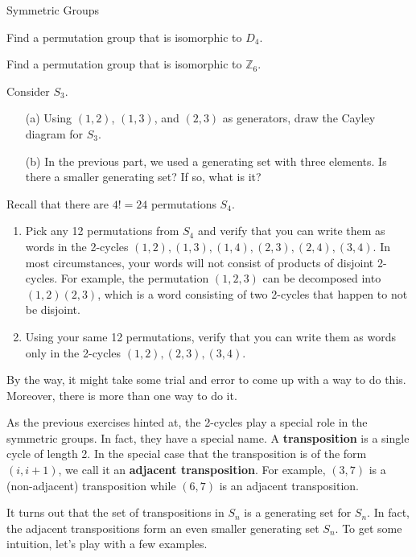 \begin{section}{Symmetric Groups}
\begin{exercise}
Find a permutation group that is isomorphic to $D_4$.
\end{exercise}

\begin{exercise}
Find a permutation group that is isomorphic to $\mathbb{Z}_6$.
\end{exercise}

\begin{exercise}
Consider $S_3$.
\begin{enumerate}
\item[(a)] Using $(1,2)$, $(1,3)$, and $(2,3)$ as generators, draw the Cayley diagram for $S_3$.
\item[(b)] In the previous part, we used a generating set with three elements.  Is there a smaller generating set?  If so, what is it?
\end{enumerate}
\end{exercise}

\begin{exercise}
Recall that there are $4!=24$ permutations $S_4$.    
\begin{enumerate}[label=\rm{(\alph*)}]
\item Pick any 12 permutations from $S_4$ and verify that you can write them as words in the 2-cycles $(1,2), (1,3), (1,4), (2,3), (2,4),(3,4)$.  In most circumstances, your words will not consist of products of disjoint 2-cycles.  For example, the permutation $(1,2,3)$ can be decomposed into $(1,2)(2,3)$, which is a word consisting of two 2-cycles that happen to not be disjoint.
\item Using your same 12 permutations, verify that you can write them as words only in the 2-cycles $(1,2),(2,3),(3,4)$.
\end{enumerate}
By the way, it might take some trial and error to come up with a way to do this.  Moreover, there is more than one way to do it.
\end{exercise}

As the previous exercises hinted at, the 2-cycles play a special role in the symmetric groups.  In fact, they have a special name.  A \textbf{transposition} is a single cycle of length 2.  In the special case that the transposition is of the form $(i,i+1)$, we call it an \textbf{adjacent transposition}.  For example, $(3,7)$ is a (non-adjacent) transposition while $(6,7)$ is an adjacent transposition.

It turns out that the set of transpositions in $S_n$ is a generating set for $S_n$.  In fact, the adjacent transpositions form an even smaller generating set $S_n$.  To get some intuition, let's play with a few examples.


\end{section}
